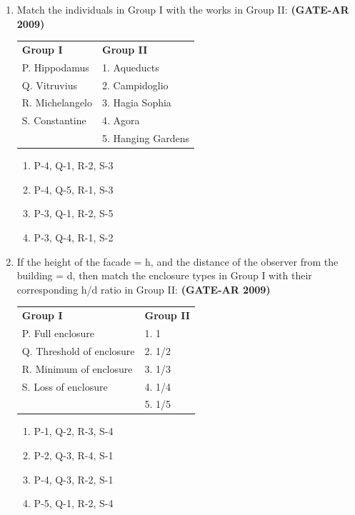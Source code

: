 \documentclass[a4paper,10pt]{article}
\begin{document}
\begin{enumerate}
    \item Match the individuals in Group I with the works in Group II: \hfill \textbf{(GATE-AR 2009)} \\
    \begin{tabular}{ l l }
	\textbf{Group I} & \textbf{Group II} \\
	P. Hippodamus & 1. Aqueducts \\
	Q. Vitruvius & 2. Campidoglio \\
	R. Michelangelo & 3. Hagia Sophia \\
	S. Constantine & 4. Agora \\
	& 5. Hanging Gardens \\
	\end{tabular}
	\begin{multicols}{2}
	\begin{enumerate}
        \item P-4, Q-1, R-2, S-3
        \item P-4, Q-5, R-1, S-3
        \item P-3, Q-1, R-2, S-5
        \item P-3, Q-4, R-1, S-2
    \end{enumerate}
	\end{multicols}
    
    \item If the height of the facade = h, and the distance of the observer from the building = d, then match the enclosure types in Group I with their corresponding h/d ratio in Group II: \hfill \textbf{(GATE-AR 2009)} \\
    \begin{tabular}{ l l }
	\textbf{Group I} & \textbf{Group II} \\
	P. Full enclosure & 1. 1 \\
	Q. Threshold of enclosure & 2. 1/2 \\
	R. Minimum of enclosure & 3. 1/3 \\
	S. Loss of enclosure & 4. 1/4 \\
	& 5. 1/5 \\
	\end{tabular}
	\begin{multicols}{2}
	\begin{enumerate}
        \item P-1, Q-2, R-3, S-4
        \item P-2, Q-3, R-4, S-1
        \item P-4, Q-3, R-2, S-1
        \item P-5, Q-1, R-2, S-4
    \end{enumerate}
	\end{multicols}


\end{enumerate}
\end{document}

